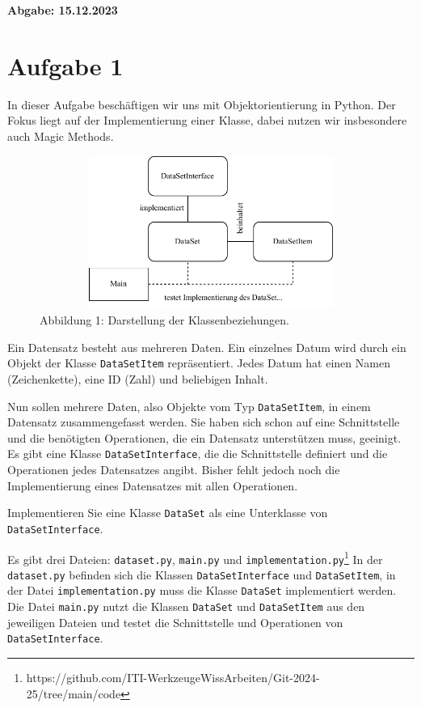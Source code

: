\documentclass[]{article}
\begin{document}
\vspace{1cm}
\begin{center}
    {\bfseries Abgabe: 15.12.2023}
\end{center}


\section*{Aufgabe 1}
In dieser Aufgabe beschäftigen wir uns mit Objektorientierung in Python. Der Fokus liegt auf der Implementierung einer Klasse, dabei nutzen wir insbesondere auch Magic Methods.

\begin{figure}[h!]
    \centering
    \includegraphics[width=12cm, height=5cm]{./../diagram/classes_files.pdf}
    \caption*{\small Abbildung 1: Darstellung der Klassenbeziehungen.}
\end{figure}

Ein Datensatz besteht aus mehreren Daten. Ein einzelnes Datum wird durch ein Objekt der Klasse \texttt{DataSetItem} repräsentiert. Jedes Datum hat einen Namen (Zeichenkette), eine ID (Zahl) und beliebigen Inhalt.

Nun sollen mehrere Daten, also Objekte vom Typ \texttt{DataSetItem}, in einem Datensatz zusammengefasst werden. Sie haben sich schon auf eine Schnittstelle und die benötigten Operationen, die ein Datensatz unterstützen muss, geeinigt. Es gibt eine Klasse \texttt{DataSetInterface}, die die Schnittstelle definiert und die Operationen jedes Datensatzes angibt. Bisher fehlt jedoch noch die Implementierung eines Datensatzes mit allen Operationen.

Implementieren Sie eine Klasse \texttt{DataSet} als eine Unterklasse von \texttt{DataSetInterface}.

Es gibt drei Dateien: \texttt{dataset.py}, \texttt{main.py} und \texttt{implementation.py}\footnote{https://github.com/ITI-WerkzeugeWissArbeiten/Git-2024-25/tree/main/code}
In der \texttt{dataset.py} befinden sich die Klassen \texttt{DataSetInterface} und \texttt{DataSetItem}, in der Datei \texttt{implementation.py} muss die Klasse \texttt{DataSet} implementiert werden. Die
Datei \texttt{main.py} nutzt die Klassen \texttt{DataSet} und \texttt{DataSetItem} aus den jeweiligen Dateien und testet die Schnittstelle und Operationen von \texttt{DataSetInterface}.
\end{document}

